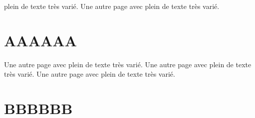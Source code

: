 \documentclass[11pt]{template/thesul}
\begin{document}











\PutLineInToc
\DontFrameChaptersInToc

% 
\Annexes
\label{ANNEXES}


    plein de texte très varié.
    Une autre page avec plein de texte très varié.

    \section{AAAAAA}

        Une autre page avec plein de texte très varié.
        Une autre page avec plein de texte très varié.
        Une autre page avec plein de texte très varié.

    \section{BBBBBB}
\end{document}
